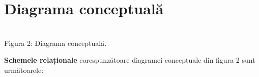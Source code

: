 \documentclass{article}
\begin{document}
	
	\newpage
	
	\section{Diagrama conceptuală}
	
	\vspace{1cm}
	\begin{center}
				
		\\[0.5cm]

		\small Figura 2: Diagrama conceptuală.
		
	\end{center}
	
	\newpage

	
	\textbf{Schemele relaționale} corespunzătoare diagramei conceptuale din figura 2 sunt următoarele:
	
\end{document}
